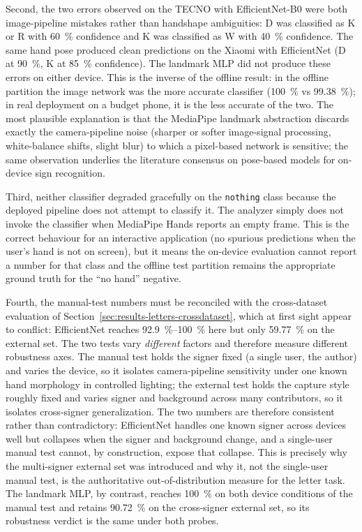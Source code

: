 Second, the two errors observed on the TECNO with EfficientNet-B0
were both image-pipeline mistakes rather than handshape
ambiguities: D was classified as K or R with \SI{60}{\percent}
confidence and K was classified as W with \SI{40}{\percent}
confidence. The same hand pose produced clean predictions on the
Xiaomi with EfficientNet (D at \SI{90}{\percent}, K at
\SI{85}{\percent} confidence). The landmark MLP did not produce these
errors on either device. This is the inverse of the offline result:
in the offline partition the image network was the more accurate
classifier (\SI{100}{\percent} vs \SI{99.38}{\percent}); in real
deployment on a budget phone, it is the less accurate of the two.
The most plausible explanation is that the MediaPipe landmark
abstraction discards exactly the camera-pipeline noise (sharper or
softer image-signal processing, white-balance shifts, slight blur)
to which a pixel-based network is sensitive; the same observation
underlies the literature consensus on pose-based models for
on-device sign recognition.

Third, neither classifier degraded gracefully on the
\texttt{nothing} class because the deployed pipeline does not
attempt to classify it. The analyzer simply does not invoke the
classifier when MediaPipe Hands reports an empty frame. This is the
correct behaviour for an interactive application (no spurious
predictions when the user's hand is not on screen), but it means the
on-device evaluation cannot report a number for that class and the
offline test partition remains the appropriate ground truth for the
``no hand'' negative.

Fourth, the manual-test numbers must be reconciled with the
cross-dataset evaluation of
Section~\ref{sec:results-letters-crossdataset}, which at first sight
appear to conflict: EfficientNet reaches \SIrange{92.9}{100}{\percent}
here but only \SI{59.77}{\percent} on the external set. The two tests
vary \emph{different} factors and therefore measure different
robustness axes. The manual test holds the signer fixed (a single
user, the author) and varies the device, so it isolates
camera-pipeline sensitivity under one known hand morphology in
controlled lighting; the external test holds the capture style
roughly fixed and varies signer and background across many
contributors, so it isolates cross-signer generalization. The two
numbers are therefore consistent rather than contradictory:
EfficientNet handles one known signer across devices well but
collapses when the signer and background change, and a single-user
manual test cannot, by construction, expose that collapse. This is
precisely why the multi-signer external set was introduced and why
it, not the single-user manual test, is the authoritative
out-of-distribution measure for the letter task. The landmark MLP,
by contrast, reaches \SI{100}{\percent} on both device conditions of
the manual test and retains \SI{90.72}{\percent} on the cross-signer
external set, so its robustness verdict is the same under both probes.

